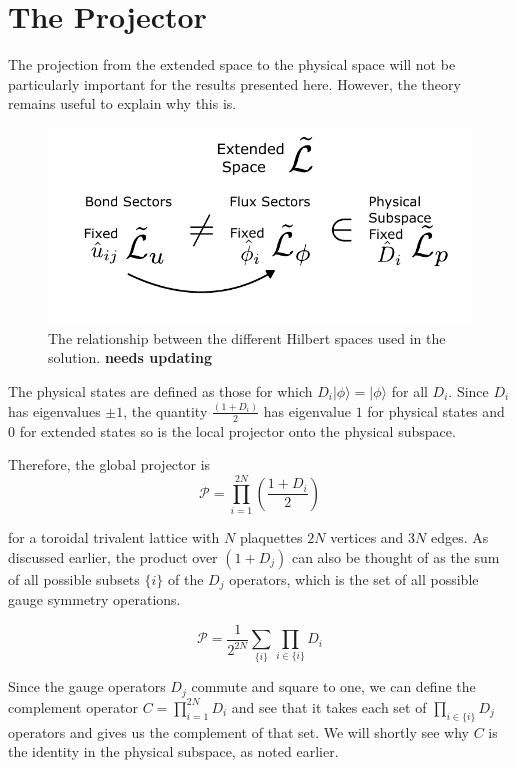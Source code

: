 \hypertarget{app-the-projector}{%
\section{The Projector}\label{app-the-projector}}

The projection from the extended space to the physical space will not be particularly important for the results presented here. However, the theory remains useful to explain why this is.

\hypertarget{fig:hilbert_spaces}{%
\begin{figure}
\centering
\includegraphics[width=1\textwidth,height=\textheight]{figure_code/amk_chapter/hilbert_spaces}
\caption[{How the different Hilbert Spaces relate to one another}]{The relationship between the different Hilbert spaces used in the solution. \textbf{needs updating}}
\label{fig:hilbert_spaces}
\end{figure}
}

The physical states are defined as those for which \(D_i |\phi\rangle = |\phi\rangle\) for all \(D_i\). Since \(D_i\) has eigenvalues \(\pm1\), the quantity \(\tfrac{(1+D_i)}{2}\) has eigenvalue \(1\) for physical states and \(0\) for extended states so is the local projector onto the physical subspace.

Therefore, the global projector is \[ \mathcal{P} = \prod_{i=1}^{2N} \left( \frac{1 + D_i}{2}\right)\]

for a toroidal trivalent lattice with \(N\) plaquettes \(2N\) vertices and \(3N\) edges. As discussed earlier, the product over \((1 + D_j)\) can also be thought of as the sum of all possible subsets \(\{i\}\) of the \(D_j\) operators, which is the set of all possible gauge symmetry operations.

\[ \mathcal{P} = \frac{1}{2^{2N}} \sum_{\{i\}} \prod_{i\in\{i\}} D_i\]

Since the gauge operators \(D_j\) commute and square to one, we can define the complement operator \(C = \prod_{i=1}^{2N} D_i\) and see that it takes each set of \(\prod_{i \in \{i\}} D_j\) operators and gives us the complement of that set. We will shortly see why \(C\) is the identity in the physical subspace, as noted earlier.

